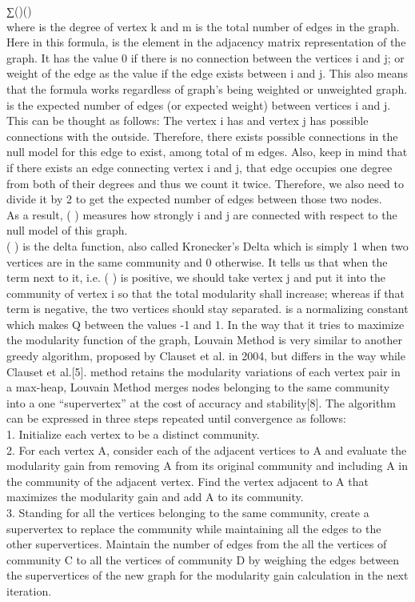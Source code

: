 \documentclass[10pt]{article}
\begin{document}
∑()() \\

where is the degree of vertex k and m is the total number of edges in the graph. Here in this formula, is the element in the adjacency matrix representation of the graph. It has the value 0 if there is no connection between the vertices i and j; or weight of the edge as the value if the edge exists between i and j. This also means that the formula works regardless of graph’s being weighted or unweighted graph. \\
is the expected number of edges (or expected weight) between vertices i and j. This can be thought as follows: The vertex i has and vertex j has possible connections with the outside. Therefore, there exists possible connections in the null model for this edge to exist, among total of m edges. Also, keep in mind that if there exists an edge connecting vertex i and j, that edge occupies one degree from both of their degrees and thus we count it twice. Therefore, we also need to divide it by 2 to get the expected number of edges between those two nodes. \\

As a result, ( ) measures how strongly i and j are connected with respect to the null model of this graph. \\

( ) is the delta function, also called Kronecker’s Delta which is simply 1 when two vertices are
in the same community and 0 otherwise. It tells us that when the term next to it, i.e. ( ) is
positive, we should take vertex j and put it into the community of vertex i so that the total modularity shall increase; whereas if that term is negative, the two vertices should stay separated.
is a normalizing constant which makes Q between the values -1 and 1.
In the way that it tries to maximize the modularity function of the graph, Louvain Method is very similar to another greedy algorithm, proposed by Clauset et al. in 2004, but differs in the way while Clauset et al.[5]. method retains the modularity variations of each vertex pair in a max-heap, Louvain Method merges nodes belonging to the same community into a one “supervertex” at the cost of accuracy and stability[8].
The algorithm can be expressed in three steps repeated until convergence as follows: \\ 
      
1. Initialize each vertex to be a distinct community. \\
2. For each vertex A, consider each of the adjacent vertices to A and evaluate the modularity gain from removing A from its original community and including A in the community of the adjacent vertex. Find the vertex adjacent to A that maximizes the modularity gain and add A to its community. \\
3. Standing for all the vertices belonging to the same community, create a supervertex to replace the community while maintaining all the edges to the other supervertices. Maintain the number of edges from the all the vertices of community C to all the vertices of community D by weighing the edges between the supervertices of the new graph for the modularity gain calculation in the next iteration. \\
\end{document}
